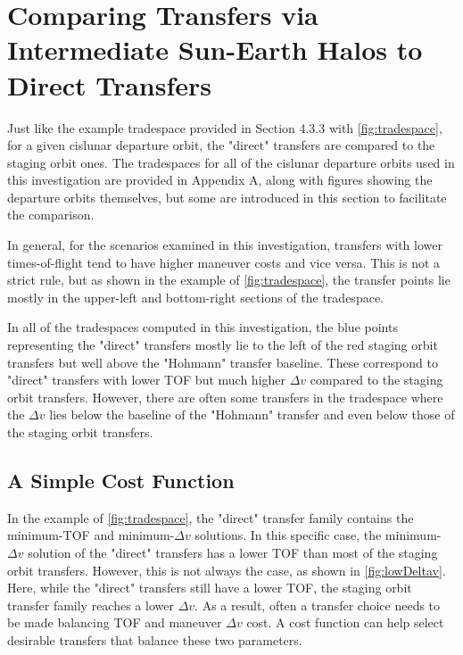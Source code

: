 \section{Comparing Transfers via Intermediate Sun-Earth Halos to Direct Transfers}
Just like the example tradespace provided in Section 4.3.3 with \cref{fig:tradespace}, for a given
cislunar departure orbit, the "direct" transfers are compared to the staging orbit ones. The
tradespaces for all of the cislunar departure orbits used in this investigation are provided in
Appendix A, along with figures showing the departure orbits themselves, but some are introduced in
this section to facilitate the comparison.

In general, for the scenarios examined in this investigation, transfers with lower times-of-flight
tend to have higher maneuver costs and vice versa. This is not a strict rule, but as shown in the
example of \cref{fig:tradespace}, the transfer points lie mostly in the upper-left and bottom-right
sections of the tradespace. 

In all of the tradespaces computed in this investigation, the blue points representing the "direct"
transfers mostly lie to the left of the red staging orbit transfers but well above the "Hohmann"
transfer baseline. These correspond to "direct" transfers with lower TOF but much higher $\Delta v$
compared to the staging orbit transfers. However, there are often some transfers in the tradespace
where the $\Delta v$ lies below the baseline of the "Hohmann" transfer and even below those of the
staging orbit transfers.

\subsection{A Simple Cost Function}
In the example of \cref{fig:tradespace}, the "direct" transfer family contains the minimum-TOF and
minimum-$\Delta v$ solutions. In this specific case, the minimum-$\Delta v$ solution of the
"direct" transfers has a lower TOF than most of the staging orbit transfers. However, this is not
always the case, as shown in \cref{fig:lowDeltav}. Here, while the "direct" transfers still have a
lower TOF, the staging orbit transfer family reaches a lower $\Delta v$. As a result, often a
transfer choice needs to be made balancing TOF and maneuver $\Delta v$ cost. A cost function can
help select desirable transfers that balance these two parameters.


